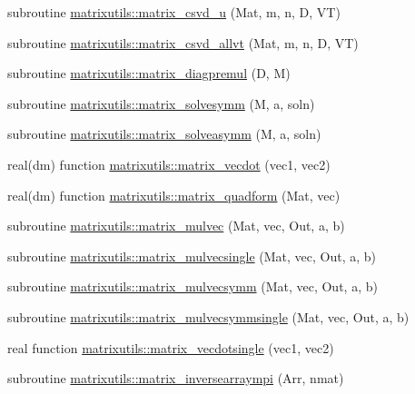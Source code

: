 \begin{DoxyCompactItemize}
\item 
subroutine \mbox{\hyperlink{namespacematrixutils_af38c4627b0e939eadba68b6ea264297b}{matrixutils\+::matrix\+\_\+csvd\+\_\+u}} (Mat, m, n, D, VT)
\item 
subroutine \mbox{\hyperlink{namespacematrixutils_aaca4350f2cff361fd0233962eba5fdc7}{matrixutils\+::matrix\+\_\+csvd\+\_\+allvt}} (Mat, m, n, D, VT)
\item 
subroutine \mbox{\hyperlink{namespacematrixutils_ac24fa96b1159f9748d7f0ea3fbdc1199}{matrixutils\+::matrix\+\_\+diagpremul}} (D, M)
\item 
subroutine \mbox{\hyperlink{namespacematrixutils_afb220a70c7ec8bcc1eb1694588300540}{matrixutils\+::matrix\+\_\+solvesymm}} (M, a, soln)
\item 
subroutine \mbox{\hyperlink{namespacematrixutils_a2662807273dfd077b6501df4d09909d9}{matrixutils\+::matrix\+\_\+solveasymm}} (M, a, soln)
\item 
real(dm) function \mbox{\hyperlink{namespacematrixutils_a14ec6bb3e63d084752f528c47653f7d7}{matrixutils\+::matrix\+\_\+vecdot}} (vec1, vec2)
\item 
real(dm) function \mbox{\hyperlink{namespacematrixutils_affa7bde611de578a07d5a1bdf612f1b2}{matrixutils\+::matrix\+\_\+quadform}} (Mat, vec)
\item 
subroutine \mbox{\hyperlink{namespacematrixutils_a7192e418b9f0d6699a80da809931fed0}{matrixutils\+::matrix\+\_\+mulvec}} (Mat, vec, Out, a, b)
\item 
subroutine \mbox{\hyperlink{namespacematrixutils_a629395ae3092616dd7db4d401570ccd0}{matrixutils\+::matrix\+\_\+mulvecsingle}} (Mat, vec, Out, a, b)
\item 
subroutine \mbox{\hyperlink{namespacematrixutils_a4bcc2b4fc8b6f2fee0c142c280851c73}{matrixutils\+::matrix\+\_\+mulvecsymm}} (Mat, vec, Out, a, b)
\item 
subroutine \mbox{\hyperlink{namespacematrixutils_a83ffeb3e4788ff67e17e5f94b70bec3a}{matrixutils\+::matrix\+\_\+mulvecsymmsingle}} (Mat, vec, Out, a, b)
\item 
real function \mbox{\hyperlink{namespacematrixutils_a7c0b5ddd8a7ff3cd1231b2b56a63aefc}{matrixutils\+::matrix\+\_\+vecdotsingle}} (vec1, vec2)
\item 
subroutine \mbox{\hyperlink{namespacematrixutils_ae6aceb4eee59e9d9300a4d7139011aac}{matrixutils\+::matrix\+\_\+inversearraympi}} (Arr, nmat)
\end{DoxyCompactItemize}
